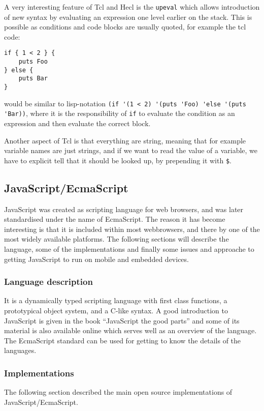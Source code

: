 \documentclass[11pt]{report}
\begin{document}
A very interesting feature of Tcl and Hecl is the \verb|upeval| which allows introduction of new syntax by evaluating an expression one level earlier on the stack. 
This is possible as conditions and code blocks are usually quoted, for example the tcl code:
\begin{verbatim}
if { 1 < 2 } {
    puts Foo
} else {
    puts Bar
}
\end{verbatim}
would be similar to lisp-notation \verb|(if '(1 < 2) '(puts 'Foo) 'else '(puts 'Bar))|, where it is the responsibility of \verb|if| to evaluate the condition as an expression and then evaluate the correct block. 

Another aspect of Tcl is that everything are string, meaning that for example variable names are just strings, and if we want to read the value of a variable, we have to explicit tell that it should be looked up, by prepending it with \verb|$|.

\subsection{JavaScript/EcmaScript}
\label{JavaScript}
JavaScript was created as scripting language for web browsers, and was later standardised under the name of EcmaScript.
The reason it has become interesting is that it is included within most webbrowsers, and there by one of the most widely available platforms.
The following sections will describe the language, some of the implementations and finally some issues and approache to getting JavaScript to run on mobile and embedded devices.

\subsubsection{Language description}
It is a dynamically typed scripting language with first class functions, a prototypical object system, and a C-like syntax.
A good introduction to JavaScript is given in the book ``JavaScript the good parts''\cite{goodparts} and some of its material is also available online \cite{crockford-javascript-web} which serves well as an overview of the language. The EcmaScript standard \cite{ecma-262} can be used for getting to know the details of the languages.


\subsubsection{Implementations}
The following section described the main open source implementations of JavaScript/EcmaScript.
\end{document}
